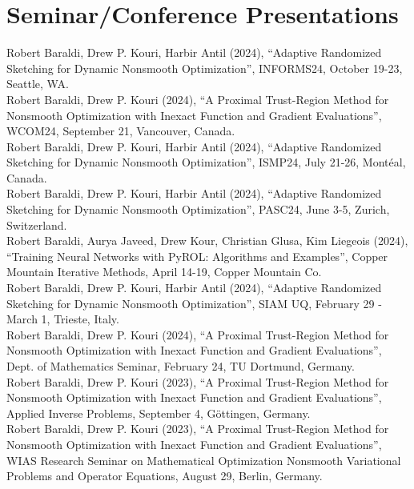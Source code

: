 \documentclass[11pt, a4paper]{article}
\newcommand{\years}[1]{\marginnote{#1}}
\begin{document}
\section*{Seminar/Conference Presentations}%
\years{2024} Robert Baraldi, Drew P. Kouri, Harbir Antil (2024),  ``Adaptive Randomized Sketching for Dynamic Nonsmooth Optimization'', INFORMS24, October 19-23, Seattle, WA. \\
\years{2024} Robert Baraldi, Drew P. Kouri (2024),  ``A Proximal Trust-Region Method for Nonsmooth Optimization with Inexact Function and Gradient Evaluations'', WCOM24, September 21, Vancouver, Canada. \\
\years{2024} Robert Baraldi, Drew P. Kouri, Harbir Antil (2024),  ``Adaptive Randomized Sketching for Dynamic Nonsmooth Optimization'', ISMP24, July 21-26, Mont{\'e}al, Canada. \\
\years{2024} Robert Baraldi, Drew P. Kouri, Harbir Antil (2024),  ``Adaptive Randomized Sketching for Dynamic Nonsmooth Optimization'', PASC24, June 3-5, Zurich, Switzerland. \\
\years{2024} Robert Baraldi, Aurya Javeed, Drew Kour, Christian Glusa, Kim Liegeois (2024),  ``Training Neural Networks with PyROL: Algorithms and Examples'', Copper Mountain Iterative Methods, April 14-19, Copper Mountain Co. \\
\years{2024} Robert Baraldi, Drew P. Kouri, Harbir Antil (2024),  ``Adaptive Randomized Sketching for Dynamic Nonsmooth Optimization'', SIAM UQ, February 29 - March 1, Trieste, Italy. \\
\years{2024} Robert Baraldi, Drew P. Kouri (2024),  ``A Proximal Trust-Region Method for Nonsmooth Optimization with Inexact Function and Gradient Evaluations'', Dept. of Mathematics Seminar, February 24, TU Dortmund, Germany. \\
\years{2023} Robert Baraldi, Drew P. Kouri (2023),  ``A Proximal Trust-Region Method for Nonsmooth Optimization with Inexact Function and Gradient Evaluations'', Applied Inverse Problems, September 4, G{\"o}ttingen, Germany. \\
\years{2023} Robert Baraldi, Drew P. Kouri (2023),  ``A Proximal Trust-Region Method for Nonsmooth Optimization with Inexact Function and Gradient Evaluations'', WIAS Research Seminar on Mathematical Optimization
Nonsmooth Variational Problems and Operator Equations, August 29, Berlin, Germany. \\
\end{document}
